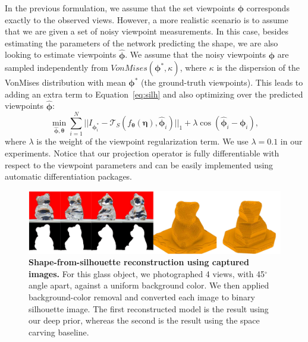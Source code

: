In the previous formulation, we assume that the set viewpoints $\bm{\phi}$ corresponds exactly to the observed views.
However, a more realistic scenario is to assume that we are given a set of noisy viewpoint measurements.
In this case, besides estimating the parameters of the network predicting the shape, we are also
looking to estimate viewpoints $\hat{\bm{\phi}}$.
We assume that the noisy viewpoints $\bm{\phi}$ are
sampled independently from $VonMises(\bm{\phi}^*, \kappa)$, where $\kappa$ is the dispersion of the VonMises distribution
with mean $\bm{\phi}^*$ (the ground-truth viewpoints).
This leads to adding an extra term to Equation~\ref{eq:silh} and also optimizing over the predicted viewpoints $\hat{\bm{\phi}}$:
\begin{equation}
    \label{eq:probview}
    \min_{\hat{\bm{\phi}}, \bm{\theta}} \sum_{i=1}^N||I_{\bm{\phi}_i^*} - \mathcal{T}_S(f_{\bm{\theta}}(\bm{\eta}), \bm{\hat\phi}_i)||_1 + \lambda \cos(\bm{\hat{\phi}}_i - \bm\phi_i),
\end{equation}
where $\lambda$ is the weight of the viewpoint regularization term.
We use $\lambda=0.1$ in our experiments.
Notice that our projection operator is fully differentiable with respect to the viewpoint parameters and can be easily
implemented using automatic differentiation packages.


\begin{figure}[t]
\centering
\includegraphics[width=1.0\linewidth]{dsp/figs/realrec.pdf}
\caption{\small \label{fig:panda} \textbf{Shape-from-silhouette reconstruction using captured images.} For this glass object, we photographed 4 views, with 45$^\circ$ angle apart, against a uniform background color. We then applied background-color removal and converted each image to binary silhouette image. The first reconstructed model is the result using our deep prior, whereas the second is the result using the space carving baseline.
    }
    \vspace{10pt}
\end{figure}


